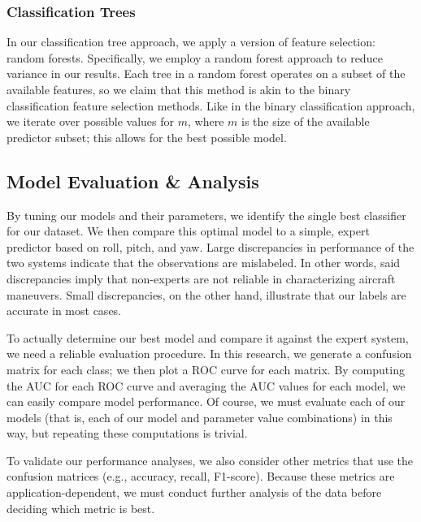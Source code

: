 \documentclass[11pt]{article}
\begin{document}
\subsubsection{Classification Trees}

In our classification tree approach, we apply a version of feature selection: random forests. Specifically, we employ a random forest approach to reduce variance in our results. Each tree in a random forest operates on a subset of the available features, so we claim that this method is akin to the binary classification feature selection methods. Like in the binary classification approach, we iterate over possible values for $m$, where $m$ is the size of the available predictor subset; this allows for the best possible model.

\subsection{Model Evaluation \& Analysis}


By tuning our models and their parameters, we identify the single best classifier for our dataset. We then compare this optimal model to a simple, expert predictor based on roll, pitch, and yaw. Large discrepancies in performance of the two systems indicate that the observations are mislabeled. In other words, said discrepancies imply that non-experts are not reliable in characterizing aircraft maneuvers. Small discrepancies, on the other hand, illustrate that our labels are accurate in most cases.


To actually determine our best model and compare it against the expert system, we need a reliable evaluation procedure. In this research, we generate a confusion matrix for each class; we then plot a \ac{ROC} curve for each matrix. By computing the \ac{AUC} for each \ac{ROC} curve and averaging the \ac{AUC} values for each model, we can easily compare model performance. Of course, we must evaluate each of our models (that is, each of our model and parameter value combinations) in this way, but repeating these computations is trivial.

To validate our performance analyses, we also consider other metrics that use the confusion matrices (e.g., accuracy, recall, F1-score). Because these metrics are application-dependent, we must conduct further analysis of the data before deciding which metric is best.
\end{document}
